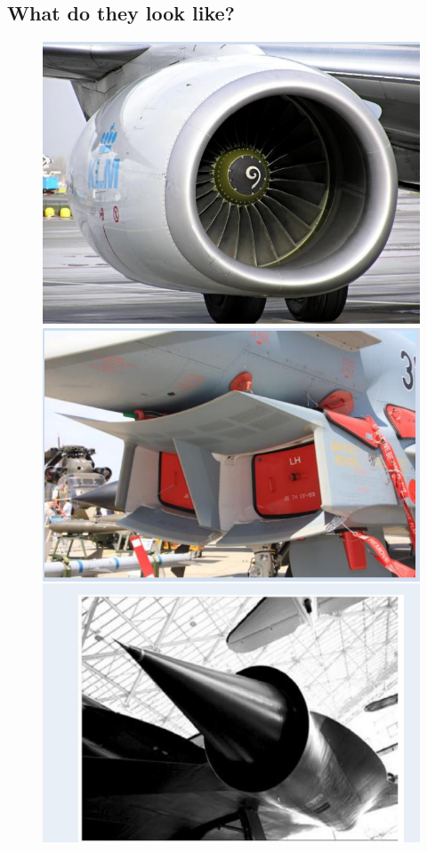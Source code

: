\documentclass[class=report, crop=false, 12pt,a4paper]{standalone}
\begin{document}
\subsection{What do they look like?}
\begin{figure}[H]
    \centering
    \begin{minipage}{.5\textwidth}
        \centering
        \includegraphics[width=.8\linewidth]{../img/diagram40.png}
    \end{minipage}%
    \begin{minipage}{.5\textwidth}
        \centering
        \includegraphics[width=.8\linewidth]{../img/diagram41.png}
    \end{minipage}
\end{figure}
\end{document}
